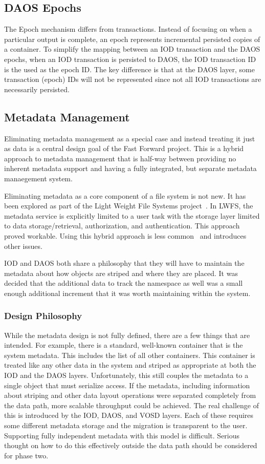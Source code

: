 \documentclass[conference]{IEEEtran}
\begin{document}
\subsection{DAOS Epochs}
The Epoch mechanism differs from transactions. Instead of focusing on when a
particular output is complete, an epoch represents incremental persisted copies
of a container. To simplify the mapping between an IOD transaction and the DAOS
epochs, when an IOD transaction is persisted to DAOS, the IOD transaction ID is
the used as the epoch ID. The key difference is that at the DAOS layer, some
transaction (epoch) IDs will not be represented since not all IOD transactions
are necessarily persisted.

\subsection{Metadata Management}
Eliminating metadata management as a special case and instead treating it just
as data is a central design goal of the Fast Forward project. This is a hybrid
approach to metadata management that is half-way between providing no inherent
metadata support and having a fully integrated, but separate metadata
manaegement system.

Eliminating metadata as a core component of a file system is not new. It has
been explored as part of the Light Weight File Systems
project~\cite{oldfield:lwfs}. In LWFS, the metadata service is explicitly
limited to a user task with the storage layer limited to data
storage/retrieval, authorization, and authentication. This approach proved
workable. Using this hybrid approach is less common~\cite{weil:2006:ceph} and
introduces other issues.

IOD and DAOS both share a philosophy that they will have to maintain the
metadata about how objects are striped and where they are placed. It was
decided that the additional data to track the namespace as well was a small
enough additional increment that it was worth maintaining within the system.

\subsubsection{Design Philosophy}
While the metadata design is not fully defined, there are a few things that
are intended. For example, there is a standard, well-known container that is
the system metadata. This includes the list of all other containers. This
container is treated like any other data in the system and striped as
appropriate at both the IOD and the DAOS layers. Unfortunately, this still
couples the metadata to a single object that must serialize access. If the
metadata, including information about striping and other data layout operations
were separated completely from the data path, more scalable throughput could be
achieved. The real challenge of this is introduced by the IOD, DAOS, and VOSD
layers. Each of these requires some different metadata storage and the
migration is transparent to the user. Supporting fully independent metadata
with this model is difficult. Serious thought on how to do this effectively
outside the data path should be considered for phase two.
\end{document}
